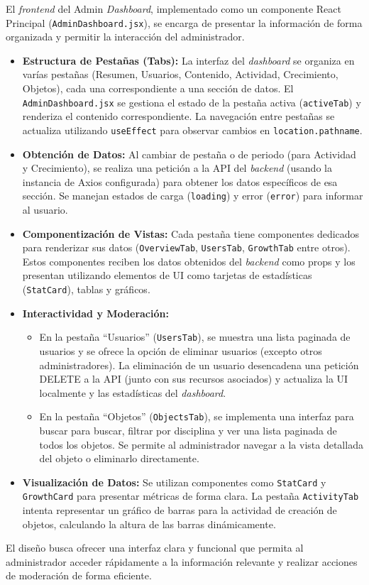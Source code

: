 El \textit{frontend} del Admin \textit{Dashboard}, implementado como un componente React Principal (\texttt{AdminDashboard.jsx}), se encarga de presentar la información de forma organizada y permitir la interacción del administrador.
\begin{itemize}
    \item \textbf{Estructura de Pestañas (Tabs):} La interfaz del \textit{dashboard} se organiza en varías pestañas (Resumen, Usuarios, Contenido, Actividad, Crecimiento, Objetos), cada una correspondiente a una sección de datos. El \texttt{AdminDashboard.jsx} se gestiona el estado de la pestaña activa (\texttt{activeTab}) y renderiza el contenido correspondiente. La navegación entre pestañas se actualiza utilizando \texttt{useEffect} para observar cambios en \texttt{location.pathname}.
    \item \textbf{Obtención de Datos:} Al cambiar de pestaña o de periodo (para Actividad y Crecimiento), se realiza una petición a la API del \textit{backend} (usando la instancia de Axios configurada) para obtener los datos específicos de esa sección. Se manejan estados de carga (\texttt{loading}) y error (\texttt{error}) para informar al usuario.
    \item \textbf{Componentización de Vistas:} Cada pestaña tiene componentes dedicados para renderizar sus datos (\texttt{OverviewTab}, \texttt{UsersTab}, \texttt{GrowthTab} entre otros). Estos componentes reciben los datos obtenidos del \textit{backend} como props y los presentan utilizando elementos de UI como tarjetas de estadísticas (\texttt{StatCard}), tablas y gráficos.
    \item \textbf{Interactividad y Moderación:} 
    \begin{itemize}
        \item En la pestaña ``Usuarios'' (\texttt{UsersTab}), se muestra una lista paginada de usuarios y se ofrece la opción de eliminar usuarios (excepto otros administradores). La eliminación de un usuario desencadena una petición DELETE a la API (junto con sus recursos asociados) y actualiza la UI localmente y las estadísticas del \textit{dashboard}.
        \item En la pestaña ``Objetos'' (\texttt{ObjectsTab}), se implementa una interfaz para buscar para buscar, filtrar por disciplina y ver una lista paginada de todos los objetos. Se permite al administrador navegar a la vista detallada del objeto o eliminarlo directamente.
    \end{itemize}
    \item \textbf{Visualización de Datos:} Se utilizan componentes como \texttt{StatCard} y \texttt{GrowthCard} para presentar métricas de forma clara. La pestaña \texttt{ActivityTab} intenta representar un gráfico de barras para la actividad de creación de objetos, calculando la altura de las barras dinámicamente.
\end{itemize}
El diseño busca ofrecer una interfaz clara y funcional que permita al administrador acceder rápidamente a la información relevante y realizar acciones de moderación de forma eficiente.

